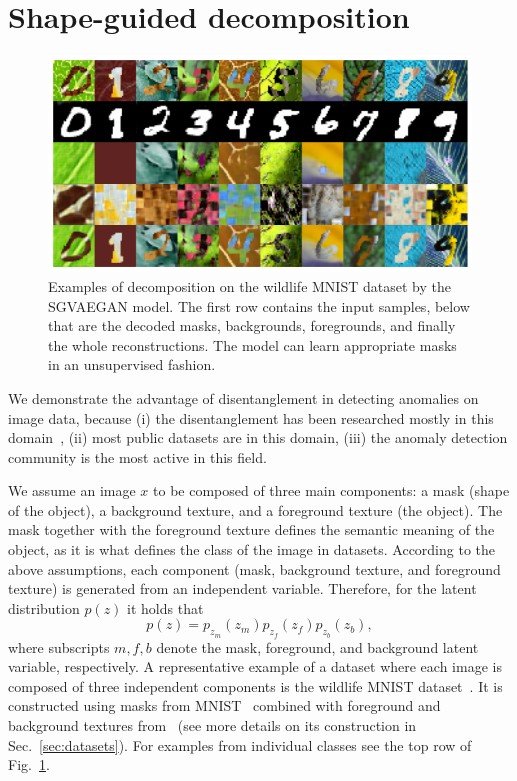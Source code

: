 \section{Shape-guided decomposition} \label{sec:model}
\begin{figure}[ht!]
    \centering
    \includegraphics[width=\textwidth]{data/chapter_sgvaegan/wmnist_grid.png}
    \caption{Examples of decomposition on the wildlife MNIST dataset by the SGVAEGAN model. The first row contains the input samples, below that are the decoded masks, backgrounds, foregrounds, and finally the whole reconstructions. The model can learn appropriate masks in an unsupervised fashion.}
    \label{fig:wmnist_grid}
\end{figure}

We demonstrate the advantage of disentanglement in detecting anomalies on image data, because (i) the disentanglement has been researched mostly in this domain~\cite{kim2018disentangling, kim2019bayes, choi2020discond}, (ii) most public datasets are in this domain, (iii) the anomaly detection community is the most active in this field.

We assume an image $x$ to be composed of three main components: a mask (shape of the object), a background texture, and a foreground texture (the object). The mask together with the foreground texture defines the semantic meaning of the object, as it is what defines the class of the image in datasets. According to the above assumptions, each component (mask, background texture, and foreground texture) is generated from an independent variable. Therefore, for the latent distribution $p(z)$ it holds that
\begin{equation} \label{eq:latent_decomposition}
     p(z) = p_{z_{m}}(z_{m})p_{z_{f}}(z_{f})p_{z_b}(z_{b}),
\end{equation}
where subscripts $m,f,b$ denote the mask, foreground, and background latent variable, respectively. 
A representative example of a dataset where each image is composed of three independent components is the wildlife MNIST dataset~\cite{sauer2021counterfactual}. It is constructed using masks from MNIST~\cite{lecun2010mnist} combined with foreground and background textures from~\cite{cimpoi2014describing} (see more details on its construction in Sec.~\ref{sec:datasets}). For examples from individual classes see the top row of Fig.~\ref{fig:wmnist_grid}. 

